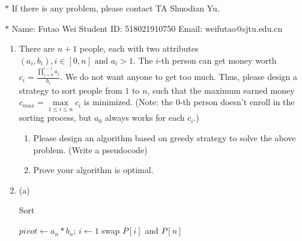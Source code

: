 \documentclass[12pt,a4paper]{article}
\makeatletter
\theoremstyle{case}
\newtheorem*{solution}{Solution}
\theoremstyle{definition}
\renewenvironment{solution}[1][Solution] {\par\pushQED{\qed}\normalfont\topsep6\p@\@plus6\p@\relax\trivlist\item[\hskip\labelsep\bfseries#1\@addpunct{.}]\ignorespaces}{\popQED\endtrivlist\@endpefalse} \makeatother
\makeatother
\begin{document}
\noindent

\noindent{}
\begin{center}
\footnotesize{\color{red}$*$ If there is any problem, please contact TA Shuodian Yu.}

\footnotesize{\color{blue}$*$ Name: Futao Wei  \quad Student ID: 518021910750 \quad Email: weifutao@sjtu.edu.cn}
\end{center}

\begin{enumerate}
    \item
    There are $n+1$ people, each with two attributes $(a_i,b_i), i\in[0,n] \text{ and } a_i>1$. The $i$-th person can get money worth $c_i = \frac{\prod_{j=0}^{i-1}{a_j}}{b_i}$. We do not want anyone to get too much. Thus, please design a strategy to sort people from $1$ to $n$, such that the maximum earned money $c_{max}=\max\limits_{1\leq i\leq n} c_i$ is minimized. (Note: the 0-th person doesn't enroll in the sorting process, but $a_0$ always works for each $c_i$.)
    \begin{enumerate}
        \item Please design an algorithm based on greedy strategy to solve the above problem. (Write a pseudocode)
        \item Prove your algorithm is optimal.
    \end{enumerate}

    \begin{solution}
    	\hfill \break
        (a) 
        \begin{minipage}[t]{0.90\textwidth}
        	\begin{algorithm}[H]
        		\caption{Sort}
        		\BlankLine
        		
        		
				$pivot \leftarrow a_n * b_n$; $i \leftarrow 1$\;
				swap $P[i]$ and $P[n]$\;
				

\end{algorithm}
\end{minipage}
\end{solution}
\end{enumerate}
\end{document}
